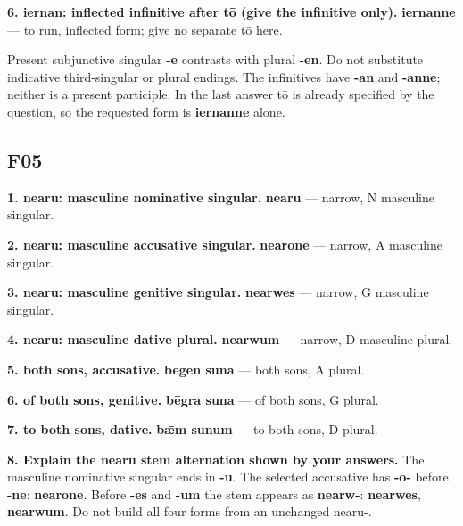 \textbf{6. iernan: inflected infinitive after tō (give the infinitive only).} \textbf{iernanne} — to run, inflected form; give no separate tō here.

Present subjunctive singular \textbf{-e} contrasts with plural \textbf{-en}. Do not substitute indicative third-singular or plural endings. The infinitives have \textbf{-an} and \textbf{-anne}; neither is a present participle. In the last answer tō is already specified by the question, so the requested form is \textbf{iernanne} alone.

\subsection*{F05}

\textbf{1. nearu: masculine nominative singular.} \textbf{nearu} — narrow, N masculine singular.

\textbf{2. nearu: masculine accusative singular.} \textbf{nearone} — narrow, A masculine singular.

\textbf{3. nearu: masculine genitive singular.} \textbf{nearwes} — narrow, G masculine singular.

\textbf{4. nearu: masculine dative plural.} \textbf{nearwum} — narrow, D masculine plural.

\textbf{5. both sons, accusative.} \textbf{bēgen suna} — both sons, A plural.

\textbf{6. of both sons, genitive.} \textbf{bēgra suna} — of both sons, G plural.

\textbf{7. to both sons, dative.} \textbf{bǣm sunum} — to both sons, D plural.

\textbf{8. Explain the nearu stem alternation shown by your answers.} The masculine nominative singular ends in \textbf{-u}. The selected accusative has \textbf{-o-} before \textbf{-ne}: \textbf{nearone}. Before \textbf{-es} and \textbf{-um} the stem appears as \textbf{nearw-}: \textbf{nearwes}, \textbf{nearwum}. Do not build all four forms from an unchanged nearu-.

